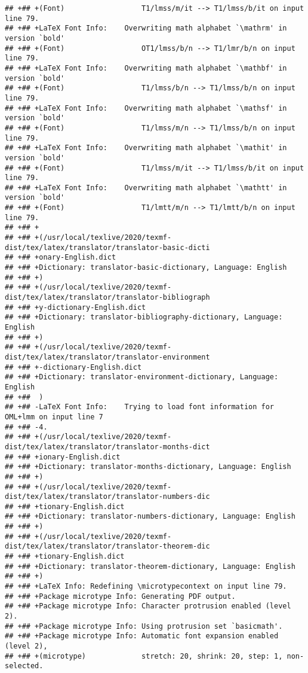 \documentclass[ignorenonframetext,]{beamer}
\begin{document}
\begin{verbatim}
## +## +(Font)                  T1/lmss/m/it --> T1/lmss/b/it on input line 79.
## +## +LaTeX Font Info:    Overwriting math alphabet `\mathrm' in version `bold'
## +## +(Font)                  OT1/lmss/b/n --> T1/lmr/b/n on input line 79.
## +## +LaTeX Font Info:    Overwriting math alphabet `\mathbf' in version `bold'
## +## +(Font)                  T1/lmss/b/n --> T1/lmss/b/n on input line 79.
## +## +LaTeX Font Info:    Overwriting math alphabet `\mathsf' in version `bold'
## +## +(Font)                  T1/lmss/m/n --> T1/lmss/b/n on input line 79.
## +## +LaTeX Font Info:    Overwriting math alphabet `\mathit' in version `bold'
## +## +(Font)                  T1/lmss/m/it --> T1/lmss/b/it on input line 79.
## +## +LaTeX Font Info:    Overwriting math alphabet `\mathtt' in version `bold'
## +## +(Font)                  T1/lmtt/m/n --> T1/lmtt/b/n on input line 79.
## +## +
## +## +(/usr/local/texlive/2020/texmf-dist/tex/latex/translator/translator-basic-dicti
## +## +onary-English.dict
## +## +Dictionary: translator-basic-dictionary, Language: English 
## +## +)
## +## +(/usr/local/texlive/2020/texmf-dist/tex/latex/translator/translator-bibliograph
## +## +y-dictionary-English.dict
## +## +Dictionary: translator-bibliography-dictionary, Language: English 
## +## +)
## +## +(/usr/local/texlive/2020/texmf-dist/tex/latex/translator/translator-environment
## +## +-dictionary-English.dict
## +## +Dictionary: translator-environment-dictionary, Language: English 
## +##  )
## +## -LaTeX Font Info:    Trying to load font information for OML+lmm on input line 7
## +## -4.
## +## +(/usr/local/texlive/2020/texmf-dist/tex/latex/translator/translator-months-dict
## +## +ionary-English.dict
## +## +Dictionary: translator-months-dictionary, Language: English 
## +## +)
## +## +(/usr/local/texlive/2020/texmf-dist/tex/latex/translator/translator-numbers-dic
## +## +tionary-English.dict
## +## +Dictionary: translator-numbers-dictionary, Language: English 
## +## +)
## +## +(/usr/local/texlive/2020/texmf-dist/tex/latex/translator/translator-theorem-dic
## +## +tionary-English.dict
## +## +Dictionary: translator-theorem-dictionary, Language: English 
## +## +)
## +## +LaTeX Info: Redefining \microtypecontext on input line 79.
## +## +Package microtype Info: Generating PDF output.
## +## +Package microtype Info: Character protrusion enabled (level 2).
## +## +Package microtype Info: Using protrusion set `basicmath'.
## +## +Package microtype Info: Automatic font expansion enabled (level 2),
## +## +(microtype)             stretch: 20, shrink: 20, step: 1, non-selected.

\end{verbatim}
\end{document}
